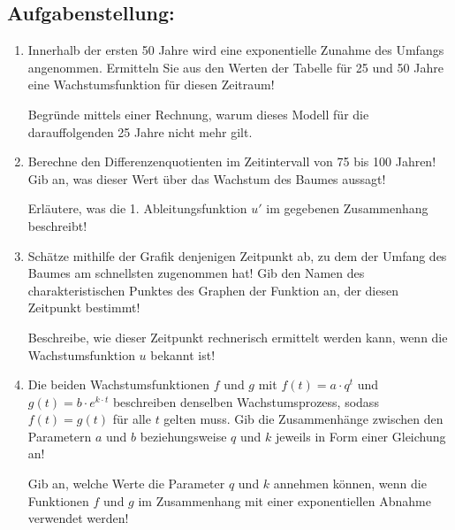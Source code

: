 \begin{langesbeispiel}
\subsection{Aufgabenstellung:}
\begin{enumerate}
	\item Innerhalb der ersten 50 Jahre wird eine exponentielle Zunahme des Umfangs angenommen. Ermitteln Sie aus den Werten der Tabelle für 25 und 50 Jahre eine Wachstumsfunktion für diesen Zeitraum! 
	
Begründe mittels einer Rechnung, warum dieses Modell für die darauffolgenden 
25 Jahre nicht mehr gilt.
	
	\item Berechne den Differenzenquotienten im Zeitintervall von 75 bis 100 Jahren! Gib an, was dieser Wert über das Wachstum des Baumes aussagt!
	
	Erläutere, was die 1. Ableitungsfunktion $u'$ im gegebenen Zusammenhang beschreibt!
	
	\item Schätze mithilfe der Grafik denjenigen Zeitpunkt ab, zu dem der Umfang des Baumes am schnellsten zugenommen hat! Gib den Namen des charakteristischen Punktes des Graphen der Funktion an, der diesen Zeitpunkt bestimmt!
	
	Beschreibe, wie dieser Zeitpunkt rechnerisch ermittelt werden kann, wenn die Wachstumsfunktion $u$ bekannt ist!
	
	\item Die beiden Wachstumsfunktionen $f$ und $g$ mit $f(t)=a\cdot q^t$ und $g(t)=b\cdot e^{k\cdot t}$ beschreiben denselben Wachstumsprozess, sodass $f(t)=g(t)$ für alle $t$ gelten muss. Gib die Zusammenhänge zwischen den Parametern $a$ und $b$ beziehungsweise $q$ und $k$ jeweils in Form einer Gleichung an!
	
	Gib an, welche Werte die Parameter $q$ und $k$ annehmen können, wenn die Funktionen $f$ und $g$ im Zusammenhang mit einer exponentiellen Abnahme verwendet werden!
				\end{enumerate}
				
\end{langesbeispiel}

